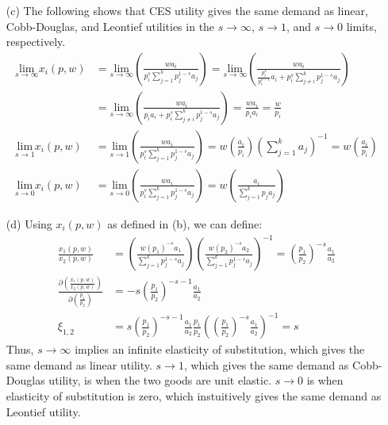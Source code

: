 \documentclass{article}
\begin{document}
\begin{itemize}
	\item[(c)] The following shows that CES utility gives the same demand as linear, Cobb-Douglas, and Leontief utilities in the $s\rightarrow\infty$, $s\rightarrow 1$, and $s\rightarrow 0$ limits, respectively.
		\begin{align*}
			\underset{s\rightarrow\infty}{\text{lim}}x_i(p,w) 	&= \underset{s\rightarrow\infty}{\text{lim}}\left(\frac{wa_i}{p_i^s\sum_{j=1}^k p_j^{1-s}a_j}\right)
				 = \underset{s\rightarrow\infty}{\text{lim}}\left(\frac{wa_i}{\frac{p_i^s}{p_i^{s-1}}a_i + p_i^s\sum_{j\neq i}^k p_j^{1-s}a_j}\right)	\\
				&= \underset{s\rightarrow\infty}{\text{lim}}\left(\frac{wa_i}{p_ia_i + p_i^s\sum_{j\neq i}^k p_j^{1-s}a_j}\right) = \frac{wa_i}{p_ia_i}	
				= \frac{w}{p_i}	\\
			\underset{s\rightarrow 1}{\text{lim}}x_i(p,w) 	&= \underset{s\rightarrow 1}{\text{lim}}\left(\frac{wa_i}{p_i^s\sum_{j=1}^k p_j^{1-s}a_j}\right)
				= w\left(\frac{a_i}{p_i}\right)\left(\sum_{j=1}^ka_j\right)^{-1} = w\left(\frac{a_i}{p_i}\right) \\
			\underset{s\rightarrow 0}{\text{lim}}x_i(p,w) 	&= \underset{s\rightarrow 0}{\text{lim}}\left(\frac{wa_i}{p_i^s\sum_{j=1}^k p_j^{1-s}a_j}\right)
				= w\left(\frac{a_i}{\sum_{j=1}^k p_ja_j}\right)
		\end{align*}
		
	\item[(d)] Using $x_i(p,w)$ as defined in (b), we can define:
		\begin{align*}
			\frac{x_1(p,w)}{x_2(p,w)}
			&= \left(\frac{w(p_1)^{-s}a_1}{\sum_{j=1}^k p_j^{1-s}a_j}\right)\left(\frac{w(p_2)^{-s}a_2}{\sum_{j=1}^k p_j^{1-s}a_j}\right)^{-1}
										= \left(\frac{p_1}{p_2}\right)^{-s}\frac{a_1}{a_2} \\
			\frac{\partial\left(\frac{x_1(p,w)}{x_2(p,w)}\right)}{\partial\left(\frac{p_1}{p_2}\right)} &= -s\left(\frac{p_1}{p_2}\right)^{-s-1}\frac{a_1}{a_2}	\\
			\xi_{1,2} &= s\left(\frac{p_1}{p_2}\right)^{-s-1}\frac{a_1}{a_2}\frac{p_1}{p_2}\left(\left(\frac{p_1}{p_2}\right)^{-s}\frac{a_1}{a_2}\right)^{-1}
				= s
		\end{align*}
		Thus, $s\rightarrow\infty$ implies an infinite elasticity of substitution, which gives the same demand as linear utility. $s\rightarrow 1$, which gives the same demand as Cobb-Douglas utility, is when the two goods are unit elastic. $s\rightarrow 0$ is when elasticity of substitution is zero, which instuitively gives the same demand as Leontief utility.
		
\end{itemize}
\end{document}

